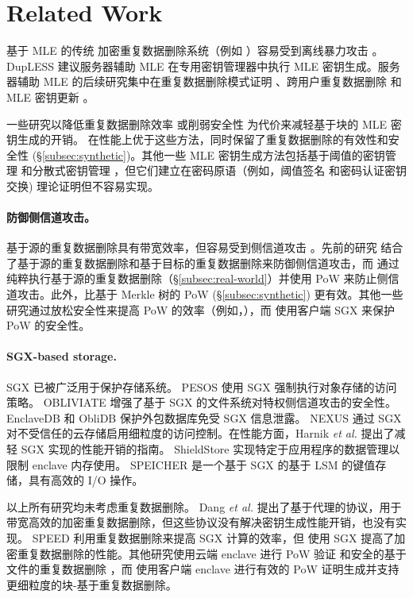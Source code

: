 \section{Related Work}
\label{sec:related_work}

 基于 MLE 的传统 \cite{bellare13a} 加密重复数据删除系统（例如 \cite{adya02,cox02,shah15}）容易受到离线暴力攻击 \cite{bellare13b}。 DupLESS \cite{bellare13b} 建议服务器辅助 MLE 在专用密钥管理器中执行 MLE 密钥生成。服务器辅助 MLE 的后续研究集中在重复数据删除模式证明 \cite{armknecht15}、跨用户重复数据删除 \cite{zhou15} 和 MLE 密钥更新 \cite{qin17}。

一些研究以降低重复数据删除效率 \cite{zhou15,qin17} 或削弱安全性 \cite{li20a} 为代价来减轻基于块的 MLE 密钥生成的开销。 \sysname 在性能上优于这些方法，同时保留了重复数据删除的有效性和安全性 (\S\ref{subsec:synthetic})。其他一些 MLE 密钥生成方法包括基于阈值的密钥管理 \cite{duan14} 和分散式密钥管理 \cite{liu15}，但它们建立在密码原语（例如，阈值签名 \cite{duan14} 和密码认证密钥交换\cite{liu15}) 理论证明但不容易实现。

\paragraph{防御侧信道攻击。} 基于源的重复数据删除具有带宽效率，但容易受到侧信道攻击 \cite{harnik10}。先前的研究 \cite{harnik10, li15} 结合了基于源的重复数据删除和基于目标的重复数据删除来防御侧信道攻击，而 \sysname 通过纯粹执行基于源的重复数据删除（\S\ref{subsec:real-world}）并使用 PoW 来防止侧信道攻击。此外，\sysname 比基于 Merkle 树的 PoW (\S\ref{subsec:synthetic}) 更有效。其他一些研究通过放松安全性来提高 PoW 的效率（例如，\cite{pietro12,xu13}），而 \sysname 使用客户端 SGX 来保护 PoW 的安全性。

\paragraph{SGX-based storage.} SGX \cite{sgx} 已被广泛用于保护存储系统。 PESOS \cite{krahn18} 使用 SGX 强制执行对象存储的访问策略。 OBLIVIATE \cite{ahmad18} 增强了基于 SGX 的文件系统对特权侧信道攻击的安全性。 EnclaveDB \cite{priebe18} 和 ObliDB \cite{eskandarian19} 保护外包数据库免受 SGX 信息泄露。 NEXUS \cite{djoko19} 通过 SGX 对不受信任的云存储启用细粒度的访问控制。在性能方面，Harnik \textit{ et al.} \cite{harnik18} 提出了减轻 SGX 实现的性能开销的指南。 ShieldStore \cite{kim19} 实现特定于应用程序的数据管理以限制 enclave 内存使用。 SPEICHER \cite{bailleu19} 是一个基于 SGX 的基于 LSM 的键值存储，具有高效的 I/O 操作。

以上所有研究均未考虑重复数据删除。 Dang \textit{ et al.} \cite{dang17} 提出了基于代理的协议，用于带宽高效的加密重复数据删除，但这些协议没有解决密钥生成性能开销，也没有实现。 SPEED \cite{cui19} 利用重复数据删除来提高 SGX 计算的效率，但 \sysname 使用 SGX 提高了加密重复数据删除的性能。其他研究使用云端 enclave 进行 PoW 验证 \cite{you20} 和安全的基于文件的重复数据删除 \cite{fuhry20}，而 \sysname 使用客户端 enclave 进行有效的 PoW 证明生成并支持更细粒度的块-基于重复数据删除。
